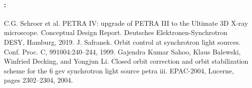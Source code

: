 \begin{refsection}
	\vspace{1em}
	\newline
	\textbf{}
	\paragraph*{}\projectdescription
	\paragraph*{\vspace{-0.8cm}}\tasks
	
	\newpage
	\thispagestyle{empty}
	\begingroup
		\paragraph*{\bibnamep:\\\vspace{-0.5cm}}
		\renewcommand{\section}[2]{}%
		{\fontsize{10}{11}\selectfont \printbibliography}
	\endgroup
\end{refsection}

\begin{thebibliography}{99}

	 C.G. Schroer et al. PETRA IV: upgrade of PETRA III to the Ultimate 3D X-ray microscope. Conceptual Design Report. Deutsches Elektronen-Synchrotron DESY, Hamburg, 2019.
	 J. Safranek. Orbit control at synchrotron light sources. Conf. Proc. C, 991004:240–244, 1999.
	 Gajendra Kumar Sahoo, Klaus Balewski, Winfried Decking, and Yongjun Li. Closed orbit correction and orbit stabilization scheme for the 6 gev synchrotron light source petra iii. EPAC-2004, Lucerne, pages 2302–2304, 2004.
	
\end{thebibliography}


